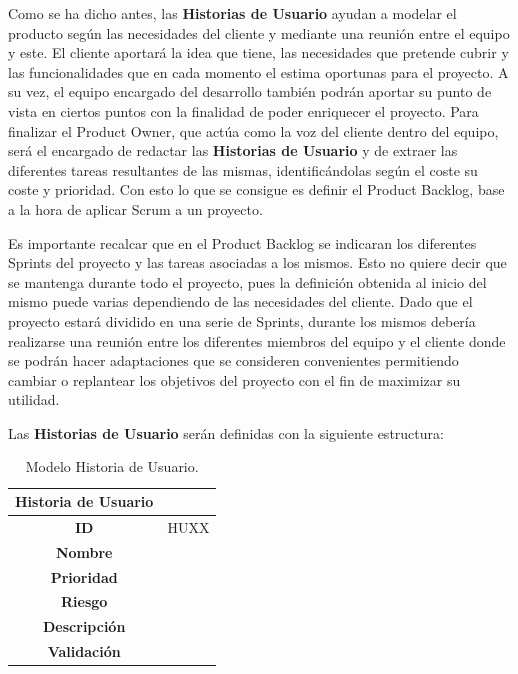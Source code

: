 Como se ha dicho antes, las \textbf{Historias de Usuario} ayudan a modelar el producto según las necesidades del cliente y mediante una reunión entre el equipo y este. El cliente aportará la idea que tiene, las necesidades que pretende cubrir y las funcionalidades que en cada momento el estima oportunas para el proyecto. A su vez, el equipo encargado del desarrollo también podrán aportar su punto de vista en ciertos puntos con la finalidad de poder enriquecer el proyecto. Para finalizar el Product Owner, que actúa como la voz del cliente dentro del equipo, será el encargado de redactar las \textbf{Historias de Usuario} y de extraer las diferentes tareas resultantes de las mismas, identificándolas según el coste su coste y prioridad. Con esto lo que se consigue es definir el Product Backlog, base a la hora de aplicar Scrum a un proyecto.

Es importante recalcar que en el Product Backlog se indicaran los diferentes Sprints del proyecto y las tareas asociadas a los mismos. Esto no quiere decir que se mantenga durante todo el proyecto, pues la definición obtenida al inicio del mismo puede varias dependiendo de las necesidades del cliente. Dado que el proyecto estará dividido en una serie de Sprints, durante los mismos debería realizarse una reunión entre los diferentes miembros del equipo y el cliente donde se podrán hacer adaptaciones que se consideren convenientes permitiendo cambiar o replantear los objetivos del proyecto con el fin de maximizar su utilidad.

Las \textbf{Historias de Usuario} serán definidas con la siguiente estructura:

\begin{table}[H]
	\begin{center}
		\begin{tabular}{| c | p{9cm} |}
			\hline
			
			Historia de Usuario &  \\ \hline
			
			
			\textbf{ID} & HUXX \\
			\textbf{Nombre} &  \\
			\textbf{Prioridad} &  \\
			\textbf{Riesgo} &  \\
			\textbf{Descripción} &  \\
			\textbf{Validación} &  \\ \hline
		\end{tabular}
		\caption{Modelo Historia de Usuario.}
	\end{center}
\end{table}

